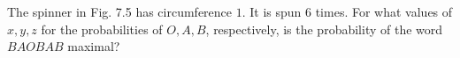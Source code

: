 The spinner in Fig. 7.5 has circumference $1$. It is spun $6$ times. For what values of $x, y, z$ for the probabilities of $O, A, B$, respectively, is the probability of the word $BAOBAB$ maximal?

\begin{center}
\end{center}
